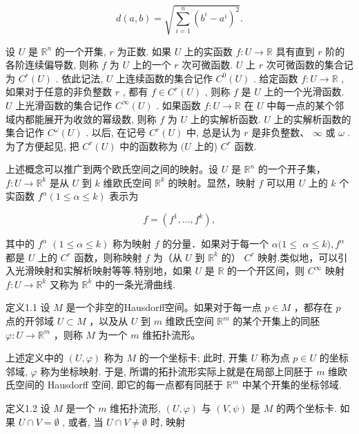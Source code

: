 $$
d (a, b) = \sqrt {\sum_ {i = 1} ^ {n} \left(b ^ {i} - a ^ {i}\right) ^ {2}}.
$$

设  $U$  是  $\mathbb{R}^n$  的一个开集,  $r$  为正数. 如果  $U$  上的实函数  $f: U \to \mathbb{R}$  具有直到  $r$  阶的各阶连续偏导数, 则称  $f$  为  $U$  上的一个  $r$  次可微函数.  $U$  上  $r$  次可微函数的集合记为  $C^r(U)$ . 依此记法,  $U$  上连续函数的集合记作  $C^0(U)$ . 给定函数  $f: U \to \mathbb{R}$ , 如果对于任意的非负整数  $r$ , 都有  $f \in C^r(U)$ , 则称  $f$  是  $U$  上的一个光滑函数.  $U$  上光滑函数的集合记作  $C^\infty(U)$ . 如果函数  $f: U \to \mathbb{R}$  在  $U$  中每一点的某个邻域内都能展开为收敛的幂级数, 则称  $f$  为  $U$  上的实解析函数.  $U$  上的实解析函数的集合记作  $C^\omega(U)$ . 以后, 在记号  $C^r(U)$  中, 总是认为  $r$  是非负整数、 $\infty$  或  $\omega$ . 为了方便起见, 把  $C^r(U)$  中的函数称为  $(U$  上的)  $C^r$  函数.

上述概念可以推广到两个欧氏空间之间的映射。设  $U$  是  $\mathbb{R}^n$  的一个开子集， $f: U \to \mathbb{R}^k$  是从  $U$  到  $k$  维欧氏空间  $\mathbb{R}^k$  的映射。显然，映射  $f$  可以用  $U$  上的  $k$  个实函数  $f^\alpha (1 \leqslant \alpha \leqslant k)$  表示为

$$
f = (f ^ {1}, \dots , f ^ {k}),
$$

其中的  $f^{\alpha}$ $(1\leqslant \alpha \leqslant k)$  称为映射  $f$  的分量．如果对于每一个  $\alpha (1\leqslant$ $\alpha \leqslant k),f^{\alpha}$  都是  $U$  上的  $C^r$  函数，则称映射  $f$  为（从  $U$  到  $\mathbb{R}^k$  的）  $C^r$  映射.类似地，可以引入光滑映射和实解析映射等等.特别地，如果  $U$  是  $\mathbb{R}$  的一个开区间，则  $C^\infty$  映射  $f:U\to \mathbb{R}^{k}$  又称为  $\mathbb{R}^k$  中的一条光滑曲线.

定义1.1 设  $M$  是一个非空的Hausdorff空间。如果对于每一点  $p \in M$ ，都存在  $p$  点的开邻域  $U \subset M$ ，以及从  $U$  到  $m$  维欧氏空间  $\mathbb{R}^m$  的某个开集上的同胚  $\varphi: U \to \mathbb{R}^m$ ，则称  $M$  为一个  $m$  维拓扑流形。

上述定义中的  $(U, \varphi)$  称为  $M$  的一个坐标卡; 此时, 开集  $U$  称为点  $p \in U$  的坐标邻域,  $\varphi$  称为坐标映射. 于是, 所谓的拓扑流形实际上就是在局部上同胚于  $m$  维欧氏空间的 Hausdorff 空间, 即它的每一点都有同胚于  $\mathbb{R}^m$  中某个开集的坐标邻域.

定义1.2 设  $M$  是一个  $m$  维拓扑流形,  $(U,\varphi)$  与  $(V,\psi)$  是  $M$  的两个坐标卡. 如果  $U\cap V = \emptyset$ , 或者, 当  $U\cap V\neq \emptyset$  时, 映射

